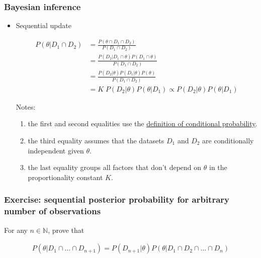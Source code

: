 \begin{frame}
    \frametitle{Bayesian inference}

    \scriptsize
    \begin{itemize}

        \item Sequential update

        \begin{align*}
            P(\theta|D_1\cap D_2)&=\frac{P(\theta\cap D_1\cap D_2)}{P(D_1\cap D_2)}\\
                                 &=\frac{P(D_2|D_1\cap\theta)P(D_1\cap\theta)}{P(D_1\cap D_2)}\\
                                 &=\frac{P(D_2|\theta)P(D_1|\theta)P(\theta)}{P(D_1\cap D_2)}\\
                                 &=K\;P(D_2|\theta)P(\theta|D_1)\propto P(D_2|\theta)P(\theta|D_1)
        \end{align*}

        Notes:

        \begin{enumerate}

            \item the first and second equalities use the
                \hyperlink{slide:defCondProb}{definition of conditional
                probability}.
            \item the third equality assumes that the datasets $D_1$ and $D_2$
                are conditionally independent given $\theta$.
            \item the last equality groups all factors that don't depend on
                $\theta$ in the proportionality constant $K$.
        \end{enumerate}

    \end{itemize}
    \normalsize

\end{frame}

\begin{frame}
    \frametitle{Exercise: sequential posterior probability for arbitrary number of observations}

    For any $n\in\mathbb{N}$, prove that

    \begin{align*}
        P(\theta|D_1\cap\ldots\cap D_{n+1})=P(D_{n+1}|\theta)P(\theta|D_1\cap D_2\cap\ldots\cap D_n)
    \end{align*}

\end{frame}

